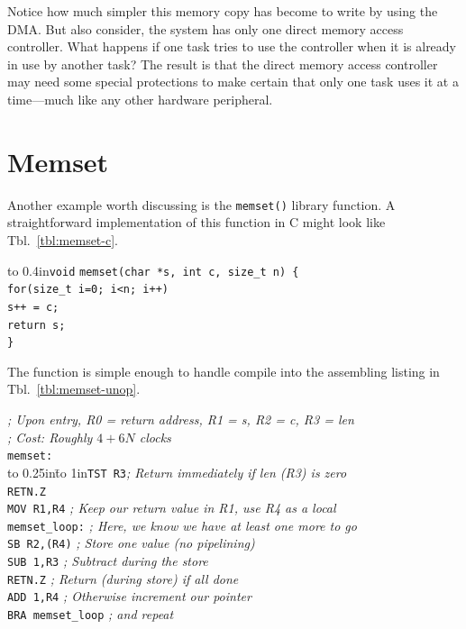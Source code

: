 \documentclass{gqtekspec}
\begin{document}
Notice how much simpler this memory copy has become to write by using the DMA. 
But also consider, the system has only one direct memory access controller. 
What happens if one task tries to use the controller when it is already in use
by another task?  The result is that the direct memory access controller may
need some special protections to make certain that only one task uses it at a 
time---much like any other hardware peripheral.

\section{Memset}
Another example worth discussing is the {\tt memset()} library function.
A straightforward implementation of this function in C might look like
Tbl.~\ref{tbl:memset-c}.
\begin{table}\begin{center}
\begin{tabbing}
\hbox to 0.4in{\tt void} \= {\tt *memset(char *s, int c, size\_t n) \{} \\
	\> {\tt for(size\_t i=0; i<n; i++)} \\
	\> \hspace{0.4in} {\tt *s++ = c;} \\
	\> {\tt return s;}\\
{\tt \}}
\end{tabbing}
\caption{Example Memset code}\label{tbl:memset-c}
\end{center}\end{table}
The function is simple enough to handle compile into the assembling listing in
Tbl.~\ref{tbl:memset-unop}.
\begin{table}\begin{center}
\begin{tabbing}
{\em ; Upon entry, R0 = return address, R1 = s, R2 = c, R3 = len}\\
{\em ; Cost: Roughly $4+6N$ clocks}\\
{\tt memset:}\\
\hbox to 0.25in{}\=\hbox to 1in{\tt TST R3}\={\em ; Return immediately if len (R3) is zero}\\
\>	{\tt RETN.Z}\\
\>	{\tt MOV R1,R4} \> {\em ; Keep our return value in R1, use R4 as a local}\\
{\tt memset\_loop:}\>\> {\em ; Here, we know we have at least one more to go}\\
\>	{\tt SB R2,(R4)} \> {\em	; Store one value (no pipelining)} \\
\>	{\tt SUB 1,R3} \> {\em; Subtract during the store}\\
\>	{\tt RETN.Z} \> {\em; Return (during store) if all done}\\
\>	{\tt ADD 1,R4} \> {\em; Otherwise increment our pointer}\\
\>	{\tt BRA memset\_loop} {\em ; and repeat}\\
\end{tabbing}
\caption{Example Memset code, minimally optimized}\label{tbl:memset-unop}
\end{center}\end{table}
\end{document}
